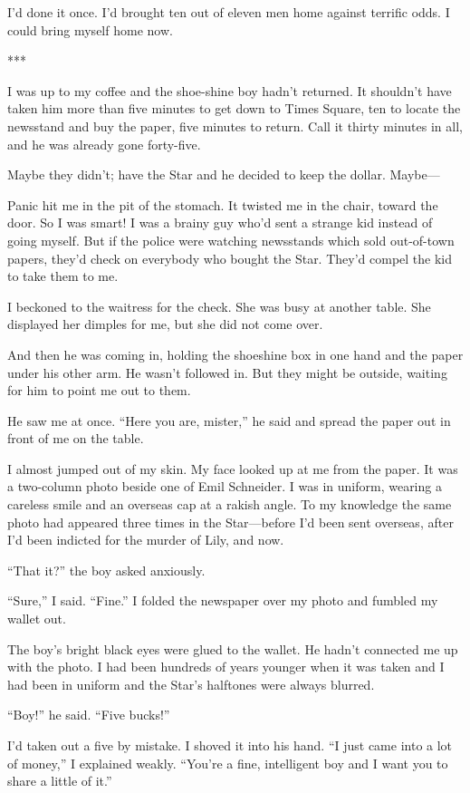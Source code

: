 \documentclass{novel}
\begin{document}
{I’d done it once. I’d brought ten out of eleven men home against terrific odds. I could bring myself home now.

***

I was up to my coffee and the shoe-shine boy hadn’t returned. It shouldn’t have taken him more than five minutes to get down to Times Square, ten to locate the newsstand and buy the paper, five minutes to return. Call it thirty minutes in all, and he was already gone forty-five.

Maybe they didn’t; have the Star and he decided to keep the dollar. Maybe—

Panic hit me in the pit of the stomach. It twisted me in the chair, toward the door. So I was smart! I was a brainy guy who’d sent a strange kid instead of going myself. But if the police were watching newsstands which sold out-of-town papers, they’d check on everybody who bought the Star. They’d compel the kid to take them to me.

I beckoned to the waitress for the check. She was busy at another table. She displayed her dimples for me, but she did not come over.

And then he was coming in, holding the shoeshine box in one hand and the paper under his other arm. He wasn’t followed in. But they might be outside, waiting for him to point me out to them.

He saw me at once. “Here you are, mister,” he said and spread the paper out in front of me on the table.

I almost jumped out of my skin. My face looked up at me from the paper. It was a two-column photo beside one of Emil Schneider. I was in uniform, wearing a careless smile and an overseas cap at a rakish angle. To my knowledge the same photo had appeared three times in the Star—before I’d been sent overseas, after I’d been indicted for the murder of Lily, and now.

“That it?” the boy asked anxiously.

“Sure,” I said. “Fine.” I folded the newspaper over my photo and fumbled my wallet out.

The boy’s bright black eyes were glued to the wallet. He hadn’t connected me up with the photo. I had been hundreds of years younger when it was taken and I had been in uniform and the Star’s halftones were always blurred.

“Boy!” he said. “Five bucks!”

I’d taken out a five by mistake. I shoved it into his hand. “I just came into a lot of money,” I explained weakly. “You’re a fine, intelligent boy and I want you to share a little of it.”

}
\end{document}

